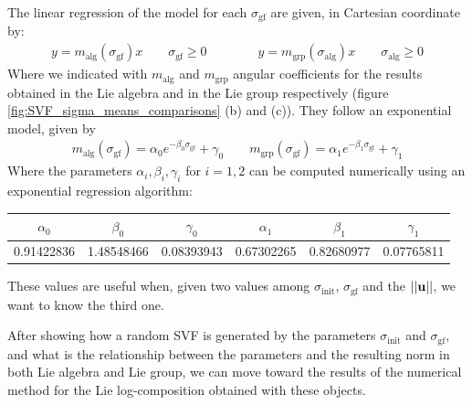 The linear regression of the model for each $\sigma_{\text{gf}}$ are given, in Cartesian coordinate by:
\begin{align}\label{eq:angular_coefficients_for_the_gf}
y = m_{\text{alg}}( \sigma_{\text{gf}} )x \qquad  \sigma_{\text{gf}} \geq 0
\qquad
\qquad
y = m_{\text{grp}}( \sigma_{\text{alg}} )x \qquad  \sigma_{\text{alg}} \ge 0
\end{align}
Where we indicated with $m_{\text{alg}}$ and $m_{\text{grp}}$ angular coefficients for the results obtained in the Lie algebra and in the Lie group respectively (figure \ref{fig:SVF_sigma_means_comparisons} (b) and (c)). They follow an exponential model, given by
\begin{align}
m_{\text{alg}}( \sigma_{\text{gf}} )
=
\alpha_0 e^{-\beta_0 \sigma_{\text{gf}}} + \gamma_0 
\qquad
m_{\text{grp}}( \sigma_{\text{gf}} )
=
\alpha_1 e^{-\beta_1 \sigma_{\text{gf}}} + \gamma_1
\end{align}
Where the parameters $\alpha_i, \beta_i, \gamma_i$ for $i=1,2$ can be computed numerically using an exponential regression algorithm:
\begin{center}
	\begin{tabular}{ c | c |c |c |c |c}
	$\alpha_0$ & $\beta_0$ & $\gamma_0$ & $\alpha_1$ & $ \beta_1$ & $\gamma_1$ \\
	\hline
	0.91422836 &  1.48548466 &  0.08393943 &  0.67302265 &  0.82680977 &  0.07765811
	\end{tabular}
\end{center}

These values are useful when, given two values among $\sigma_{\text{init}}$, $\sigma_{\text{gf}}$ and the $\vert\lvert \mathbf{u} \rvert\vert$, we want to know the third one.

After showing how a random SVF is generated by the parameters $\sigma_{\text{init}}$ and $\sigma_{\text{gf}}$, and what is the relationship between the parameters and the resulting norm in both Lie algebra and Lie group, we can move toward the results of the numerical method for the Lie log-composition obtained with these objects.

